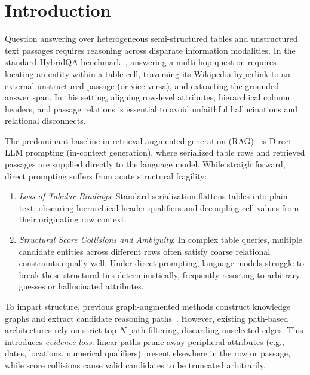 \documentclass[runningheads]{llncs}
\begin{document}
\section{Introduction}
Question answering over heterogeneous semi-structured tables and unstructured text passages requires reasoning across disparate information modalities. In the standard HybridQA benchmark~\cite{hybridqa}, answering a multi-hop question requires locating an entity within a table cell, traversing its Wikipedia hyperlink to an external unstructured passage (or vice-versa), and extracting the grounded answer span. In this setting, aligning row-level attributes, hierarchical column headers, and passage relations is essential to avoid unfaithful hallucinations and relational disconnects.

The predominant baseline in retrieval-augmented generation (RAG)~\cite{lewis2020rag,guu2020realm,gao2023ragsurvey} is Direct LLM prompting (in-context generation), where serialized table rows and retrieved passages are supplied directly to the language model. While straightforward, direct prompting suffers from acute structural fragility:
\begin{enumerate}
    \item \emph{Loss of Tabular Bindings}: Standard serialization flattens tables into plain text, obscuring hierarchical header qualifiers and decoupling cell values from their originating row context.
    \item \emph{Structural Score Collisions and Ambiguity}: In complex table queries, multiple candidate entities across different rows often satisfy coarse relational constraints equally well. Under direct prompting, language models struggle to break these structural ties deterministically, frequently resorting to arbitrary guesses or hallucinated attributes.
\end{enumerate}

To impart structure, previous graph-augmented methods construct knowledge graphs and extract candidate reasoning paths~\cite{yasunaga2021qagnn,pan2024unifying,peng2024graphragsurvey}. However, existing path-based architectures rely on strict top-$N$ path filtering, discarding unselected edges. This introduces \emph{evidence loss}: linear paths prune away peripheral attributes (e.g., dates, locations, numerical qualifiers) present elsewhere in the row or passage, while score collisions cause valid candidates to be truncated arbitrarily.
\end{document}
